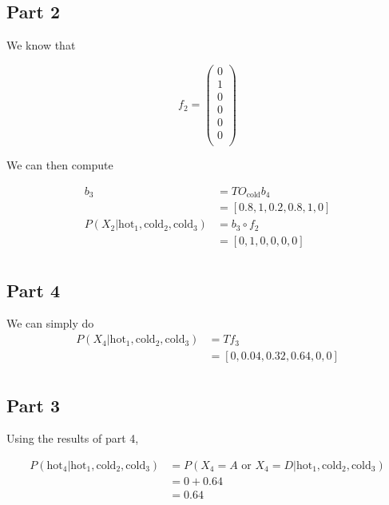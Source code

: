 \documentclass[12pt]{article}
\begin{document}
\subsection{Part 2}

We know that

$$
f_2 = \begin{pmatrix}
    0 \\
    1 \\
    0 \\
    0 \\
    0 \\
    0 \\
    \end{pmatrix}
$$

We can then compute

\begin{align*}
    b_3 &= T O_{\text{cold}} b_4 \\
    &= [0.8, 1, 0.2, 0.8, 1, 0] \\
    P(X_2 | \text{hot}_1, \text{cold}_2, \text{cold}_3) &= b_3 \circ f_2 \\
    &= [0, 1, 0, 0, 0, 0] \\
\end{align*}

\setcounter{subsection}{3}
\subsection{Part 4}

We can simply do
\begin{align*}
    P(X_4 | \text{hot}_1, \text{cold}_2, \text{cold}_3) &= T f_3 \\
    &= [0, 0.04, 0.32, 0.64, 0, 0] \\
\end{align*}

\setcounter{subsection}{2}
\subsection{Part 3}

Using the results of part 4,

\begin{align*}
    P(\text{hot}_4 | \text{hot}_1, \text{cold}_2, \text{cold}_3) &= P(X_4 = A \text{ or } X_4 = D | \text{hot}_1, \text{cold}_2, \text{cold}_3) \\
    &= 0 + 0.64 \\
    &= 0.64 \\
\end{align*}
\end{document}
